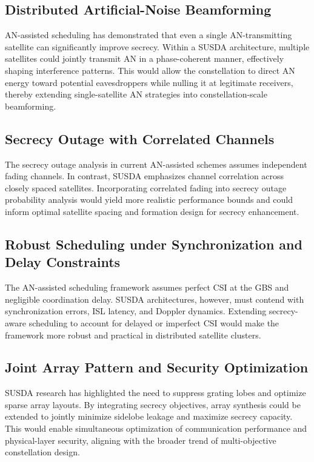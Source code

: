 \documentclass[conference]{IEEEtran}
\begin{document}
\subsection{Distributed Artificial-Noise Beamforming} \label{sec5.1}
AN-assisted scheduling has demonstrated that even a single AN-transmitting satellite can significantly improve secrecy. Within a SUSDA architecture, multiple satellites could jointly transmit AN in a phase-coherent manner, effectively shaping interference patterns. This would allow the constellation to direct AN energy toward potential eavesdroppers while nulling it at legitimate receivers, thereby extending single-satellite AN strategies into constellation-scale beamforming.

\subsection{Secrecy Outage with Correlated Channels} \label{sec5.2}
The secrecy outage analysis in current AN-assisted schemes assumes independent fading channels. In contrast, SUSDA emphasizes channel correlation across closely spaced satellites. Incorporating correlated fading into secrecy outage probability analysis would yield more realistic performance bounds and could inform optimal satellite spacing and formation design for secrecy enhancement.

\subsection{Robust Scheduling under Synchronization and Delay Constraints} \label{sec5.3}
The AN-assisted scheduling framework assumes perfect CSI at the GBS and negligible coordination delay. SUSDA architectures, however, must contend with synchronization errors, ISL latency, and Doppler dynamics. Extending secrecy-aware scheduling to account for delayed or imperfect CSI would make the framework more robust and practical in distributed satellite clusters.

\subsection{Joint Array Pattern and Security Optimization} \label{sec5.4}
SUSDA research has highlighted the need to suppress grating lobes and optimize sparse array layouts. By integrating secrecy objectives, array synthesis could be extended to jointly minimize sidelobe leakage and maximize secrecy capacity. This would enable simultaneous optimization of communication performance and physical-layer security, aligning with the broader trend of multi-objective constellation design.
\end{document}
